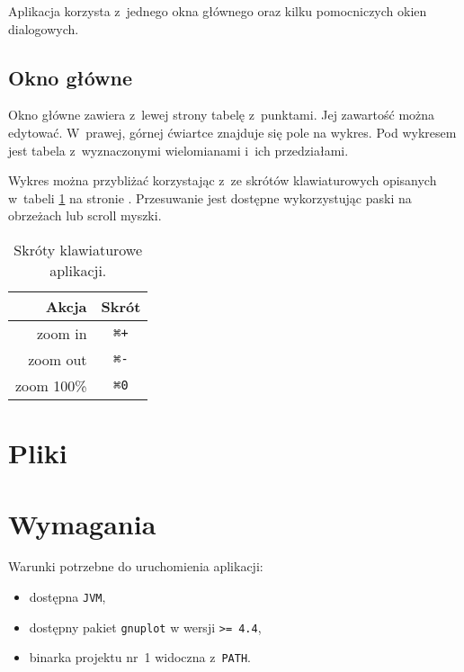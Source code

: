 \documentclass[10pt,a4paper]{article}
\newcommand{\prog}[1]{\texttt{#1}}
\begin{document}
Aplikacja korzysta z~jednego okna głównego oraz kilku pomocniczych okien
dialogowych.

\subsection{Okno główne}

Okno główne zawiera z~lewej strony tabelę z~punktami. Jej zawartość można
edytować. W~prawej, górnej ćwiartce znajduje się pole na wykres. Pod wykresem
jest tabela z~wyznaczonymi wielomianami i~ich przedziałami.

Wykres można przybliżać korzystając z~ze skrótów klawiaturowych opisanych
w~tabeli \ref{tab:skroty} na stronie \pageref{tab:skroty}. Przesuwanie jest
dostępne wykorzystując paski na obrzeżach lub scroll myszki.

\begin{table}[p]
  \centering
  \begin{tabular}{r c}
    \toprule
    {\bf Akcja} & {\bf Skrót} \\
    \midrule
    zoom in     &  \prog{⌘+}  \\
    zoom out    &  \prog{⌘-}  \\
    zoom 100\%  &  \prog{⌘0}  \\
    \bottomrule
  \end{tabular}
  \caption{Skróty klawiaturowe aplikacji.}
  \label{tab:skroty}
\end{table}

\section{Pliki}
\label{sec:pliki}

\section{Wymagania}
\label{sec:wymagania}

Warunki potrzebne do uruchomienia aplikacji:
\begin{itemize}
  \item dostępna \prog{JVM},
  \item dostępny pakiet \prog{gnuplot} w wersji \prog{>= 4.4},
  \item binarka projektu nr~1 widoczna z~\prog{PATH}.
\end{itemize}
\end{document}
